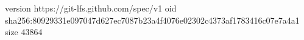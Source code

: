 version https://git-lfs.github.com/spec/v1
oid sha256:80929331e097047d627ec7087b23a4f4076e02302c4373af1783416c07e7a4a1
size 43864
